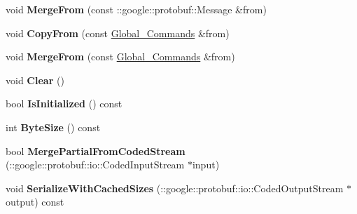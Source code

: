 \begin{DoxyCompactItemize}
\item 
\hypertarget{classvss__command_1_1Global__Commands_a70b24974df993bc6cd742f074555544b}{void {\bfseries Merge\-From} (const \-::google\-::protobuf\-::\-Message \&from)}\label{classvss__command_1_1Global__Commands_a70b24974df993bc6cd742f074555544b}

\item 
\hypertarget{classvss__command_1_1Global__Commands_a2c2be618a14de139a996c3f40cdcaa7c}{void {\bfseries Copy\-From} (const \hyperlink{classvss__command_1_1Global__Commands}{Global\-\_\-\-Commands} \&from)}\label{classvss__command_1_1Global__Commands_a2c2be618a14de139a996c3f40cdcaa7c}

\item 
\hypertarget{classvss__command_1_1Global__Commands_a72522cd185ed392c8dba2b746f1c10be}{void {\bfseries Merge\-From} (const \hyperlink{classvss__command_1_1Global__Commands}{Global\-\_\-\-Commands} \&from)}\label{classvss__command_1_1Global__Commands_a72522cd185ed392c8dba2b746f1c10be}

\item 
\hypertarget{classvss__command_1_1Global__Commands_a9027fa1a333a49d2a9e7927f1241d2d7}{void {\bfseries Clear} ()}\label{classvss__command_1_1Global__Commands_a9027fa1a333a49d2a9e7927f1241d2d7}

\item 
\hypertarget{classvss__command_1_1Global__Commands_ab59f63095dd243cd7311d9142a9326ef}{bool {\bfseries Is\-Initialized} () const }\label{classvss__command_1_1Global__Commands_ab59f63095dd243cd7311d9142a9326ef}

\item 
\hypertarget{classvss__command_1_1Global__Commands_a05036b0569ebf9d13ff9cee1430ffb12}{int {\bfseries Byte\-Size} () const }\label{classvss__command_1_1Global__Commands_a05036b0569ebf9d13ff9cee1430ffb12}

\item 
\hypertarget{classvss__command_1_1Global__Commands_a0d0fcd0747bad0226fb5a0829f45ed1b}{bool {\bfseries Merge\-Partial\-From\-Coded\-Stream} (\-::google\-::protobuf\-::io\-::\-Coded\-Input\-Stream $\ast$input)}\label{classvss__command_1_1Global__Commands_a0d0fcd0747bad0226fb5a0829f45ed1b}

\item 
\hypertarget{classvss__command_1_1Global__Commands_a35292dbb1e0ac73f11bedc01a64e751e}{void {\bfseries Serialize\-With\-Cached\-Sizes} (\-::google\-::protobuf\-::io\-::\-Coded\-Output\-Stream $\ast$output) const }\label{classvss__command_1_1Global__Commands_a35292dbb1e0ac73f11bedc01a64e751e}


\end{DoxyCompactItemize}
